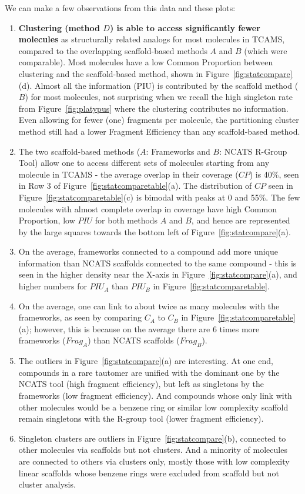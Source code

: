\documentclass[journal=jacsat,biochem,manuscript=article]{achemso}
\newcommand*\fref[1]{Figure~\ref{fig:#1}}
\newcommand*\eg{e.g.,~}
\newcommand*\ie{i.e.,~}
\begin{document}
We can make a few observations from this data and these plots:
\begin{enumerate}
\item {\bf Clustering (method $D$) is able to access significantly fewer molecules} as structurally related analogs for most molecules in TCAMS, compared to the overlapping scaffold-based methods $A$ and $B$ (which were comparable). Most molecules have a low Common Proportion between clustering and the scaffold-based method, shown in \fref{statcompare}(d). Almost all the information (PIU) is contributed by the scaffold method ($B$) for most molecules, not surprising when we recall the high singleton rate from \fref{platypus} where the clustering contributes no information. Even allowing for fewer (one) fragments per molecule, the partitioning cluster method still had a lower Fragment Efficiency than any scaffold-based method.  
\item The two scaffold-based methods ($A$: Frameworks and $B$: NCATS R-Group Tool) allow one to access different sets of molecules starting from any molecule in TCAMS - the average overlap in their coverage ($CP$) is 40\%, seen in Row 3 of \fref{statcomparetable}(a).  The distribution of $CP$ seen in  \fref{statcomparetable}(c) is bimodal with peaks at 0 and 55\%. The few molecules with almost complete overlap in coverage have high Common Proportion, low $PIU$ for both methods $A$ and $B$, and hence are represented by the large squares towards the bottom left of \fref{statcompare}(a). 
\item On the average, frameworks connected to a compound add more unique information than NCATS scaffolds connected to the same compound - this is seen in the higher density near the X-axis in \fref{statcompare}(a), and higher numbers for $PIU_A$ than $PIU_B$ in  \fref{statcomparetable}.   
\item On the average, one can link to about twice as many molecules with the frameworks, as seen by comparing $C_A$ to $C_B$ in \fref{statcomparetable}(a); however, this is because on the average there are 6 times more frameworks ($Frag_A$) than NCATS scaffolds ($Frag_B$). %
\item The outliers in \fref{statcompare}(a) are interesting. At one end, compounds in a rare tautomer are unified with the dominant one by the NCATS tool (high fragment efficiency), but left as singletons by the frameworks (low fragment efficiency). And compounds whose only link with other molecules would be a benzene ring or similar low complexity scaffold remain singletons with the R-group tool (lower fragment efficiency).
\item Singleton clusters are outliers in \fref{statcompare}(b), connected to other molecules via scaffolds but not clusters. And a minority of molecules are connected to others via clusters only, mostly those with low complexity linear scaffolds whose benzene rings were excluded from scaffold but not cluster analysis.    
\end{enumerate}
\end{document}
